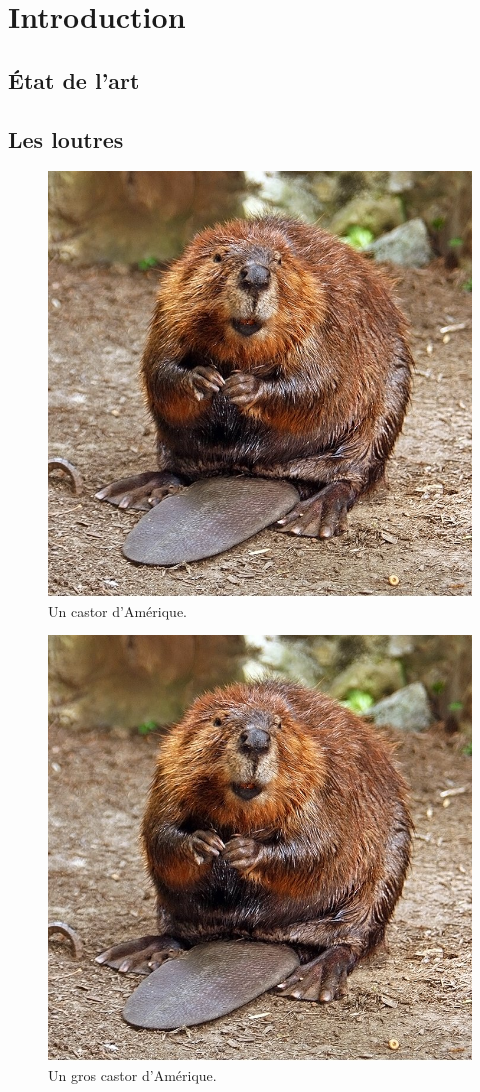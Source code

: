 \chapter{Introduction}

\section{État de l'art}
\blindtext[10]

\section{Les loutres}
\blindtext[6]

\begin{figure}[tb]
\begin{center}
\includegraphics[width = .45 \textwidth]{introduction/figures/castor.jpg}
\end{center}
\caption{Un castor d’Amérique.}
\label{fig:castor}
\end{figure}

\begin{figure}[tb]
\begin{center}
\includegraphics[width = .8\textwidth]{introduction/figures/castor.jpg}
\end{center}
\caption{Un {\huge gros} castor d’Amérique.}
\label{fig:groscastor}
\end{figure}

